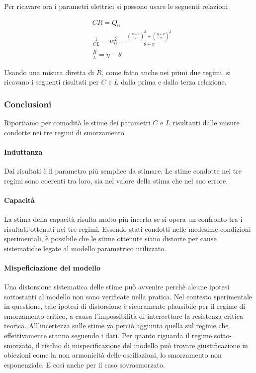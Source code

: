 Per ricavare ora i parametri elettrici si possono usare le seguenti relazioni

\begin{align}
&    CR = Q_0  \\
&    \frac{1}{CL} = w_0^2 = \frac{ (\frac{\eta-\theta}{2})^2 + (\frac{\eta+\theta}{2})^2 }
{\theta + \eta} \\
&    \frac{R}{L} = \eta-\theta
\end{align}

Usando una misura diretta di $R$, come fatto anche nei primi due regimi, si ricavano i seguenti risultati per $C$ e $L$ dalla prima e dalla terza relazione.





\subsubsection{Conclusioni}

Riportiamo per comodità le stime dei parametri $C$ e $L$ risultanti dalle misure condotte nei tre regimi di smorzamento.



\paragraph{Induttanza} Dai risultati è il parametro più semplice da stimare. Le stime condotte nei tre regimi sono coerenti tra loro, sia nel valore della stima che nel suo errore.

\paragraph{Capacità} La stima della capacità risulta molto più incerta se si opera un confronto tra i risultati ottenuti nei tre regimi. Essendo stati condotti nelle medesime condizioni sperimentali, è possibile che le stime ottenute siano distorte per cause sistematiche legate al modello parametrico utilizzato.

\paragraph{Mispeficiazione del modello}
Una distorsione sistematica delle stime può avvenire perchè alcune ipotesi sottostanti al modello non sono verificate nella pratica.
Nel contesto sperimentale in questione, tale ipotesi di distorsione è sicuramente plausibile per il regime di smorzamento critico, a causa l'impossibilità di intercettare la resistenza critica teorica. All'incertezza sulle stime va perciò aggiunta quella sul regime che effettivamente stanno seguendo i dati.
Per quanto riguarda il regime sotto-smorzato, il rischio di mispecificazione del modello può trovare giustificazione in obiezioni come la non armonicità delle oscillazioni, lo smorzamento non esponenziale. E così anche per il caso sovrasmorzato.

